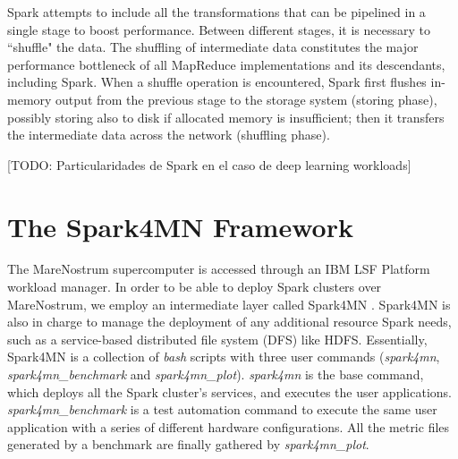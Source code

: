 \documentclass[journal]{IEEEtran}
\begin{document}
Spark attempts to include all the transformations that can be pipelined in a single stage to boost performance. Between different stages, it is necessary to ``shuffle" the data. The shuffling of intermediate data constitutes the major performance bottleneck of all MapReduce implementations and its descendants, including Spark. When a shuffle operation is encountered, Spark first flushes in-memory output from the previous stage to the storage system (storing phase), possibly storing also to disk if allocated memory is insufficient; then it transfers the intermediate data across the network (shuffling phase). 

[TODO: Particularidades de Spark en el caso de deep learning workloads]

\section{The Spark4MN Framework}
\label{sec:spark4mn}
The MareNostrum supercomputer is accessed through an IBM LSF Platform workload manager. In order to be able to deploy Spark clusters over MareNostrum, we employ an intermediate layer called Spark4MN \cite{conf/bigdataconf/TousGournaris15}. Spark4MN is also in charge to manage the deployment of any additional resource Spark needs, such as a service-based distributed file system (DFS) like HDFS.
Essentially, Spark4MN is a collection of {\it bash} scripts with three user commands ({\it spark4mn}, {\it spark4mn\_benchmark} and {\it spark4mn\_plot}). {\it spark4mn} is the base command, which deploys all the Spark
cluster's services, and executes the user applications. {\it spark4mn\_benchmark} is a test automation command to execute the same user application with a series of different hardware configurations. All the metric files generated by a benchmark are finally gathered by {\it spark4mn\_plot}.

\end{document}
